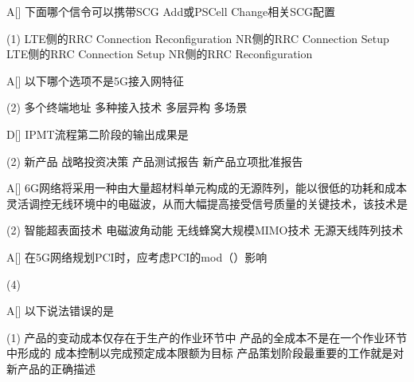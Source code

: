 \begin{choice}{A}[]
    下面哪个信令可以携带SCG Add或PSCell Change相关SCG配置
    \begin{tasks}(1)
        \task LTE侧的RRC Connection Reconfiguration
        \task NR侧的RRC Connection Setup
        \task LTE侧的RRC Connection Setup
        \task NR侧的RRC Reconfiguration
    \end{tasks}
\end{choice}


\begin{choice}{A}[]
    以下哪个选项不是5G接入网特征
    \begin{tasks}(2)
        \task 多个终端地址
        \task 多种接入技术
        \task 多层异构
        \task 多场景
    \end{tasks}
\end{choice}


\begin{choice}{D}[]
    IPMT流程第二阶段的输出成果是
    \begin{tasks}(2)
        \task 新产品
        \task 战略投资决策
        \task 产品测试报告
        \task 新产品立项批准报告
    \end{tasks}
\end{choice}


\begin{choice}{A}[]
    6G网络将采用一种由大量超材料单元构成的无源阵列，能以很低的功耗和成本灵活调控无线环境中的电磁波，从而大幅提高接受信号质量的关键技术，该技术是
    \begin{tasks}(2)
        \task 智能超表面技术
        \task 电磁波角动能
        \task 无线蜂窝大规模MIMO技术
        \task 无源天线阵列技术
    \end{tasks}
\end{choice}

\begin{choice}{A}[]
    在5G网络规划PCI时，应考虑PCI的mod（\quad）影响
    \begin{tasks}(4)
    \end{tasks}
\end{choice}

\begin{choice}{A}[]
    以下说法错误的是
    \begin{tasks}(1)
        \task 产品的变动成本仅存在于生产的作业环节中
        \task 产品的全成本不是在一个作业环节中形成的
        \task 成本控制以完成预定成本限额为目标
        \task 产品策划阶段最重要的工作就是对新产品的正确描述
    \end{tasks}
\end{choice}



